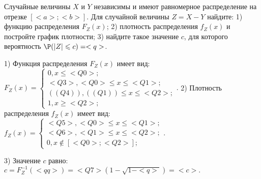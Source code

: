 \documentclass{article}%
\begin{document}
\begin{problem}
Случайные величины $X$ и $Y$ независимы и имеют равномерное
распределение на отрезке $[<a>;<b>]$. Для случайной величины $Z=X-Y$ найдите:
1) функцию распределения $F_Z(x)$;
2) плотность распределения $f_Z(x)$ и постройте график плотности;
3) найдите такое значение $c$, для которого вероятность $\P(|Z|\leqslant c)=<q>$.
\end{problem}

\begin{solution*}
1) Функция распределения $F_Z(x)$ имеет вид:
$
F_Z(x)=\left\{
\begin{array}{l}
0, x\leqslant <Q0>;\\
<Q3>, <Q0>\leqslant x\leqslant <Q1>;\\
((Q4)), ((Q1))\leqslant x\leqslant <Q2>;\\
1, x\geqslant <Q2>;
\end{array}.
\right.
$
2) Плотность распределения $f_Z(x)$ имеет вид:
$
f_Z(x)=\left\{
\begin{array}{l}
<Q5>, <Q0>\leqslant x\leqslant <Q1>;\\
<Q6>, <Q1>\leqslant x\leqslant <Q2>;\\
0, x\not\in [<Q0>;<Q2>];
\end{array}.
\right.
$

3) Значение $c$ равно:
$
c=F_Z^{-1}(<qq>)=<Q7>\left(1-\sqrt{1-<q>}\right)=
<c>.
$
\end{solution*}
\end{document}
